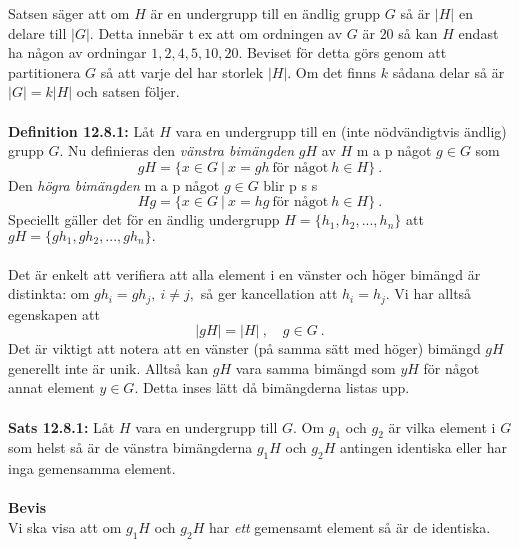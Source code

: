 \documentclass{article}
\begin{document}
Satsen säger att om $H$ är en undergrupp till en ändlig grupp $G$ så är $|H|$ en delare till $|G|$. Detta innebär t ex att om ordningen av $G$ är $20$ så kan $H$ endast ha någon av ordningar $1,2,4,5,10,20$. Beviset för detta görs genom att partitionera $G$ så att varje del har storlek $|H|$. Om det finns $k$ sådana delar så är $|G|=k|H|$ och satsen följer.\\ \\
\textbf{Definition 12.8.1:} Låt $H$ vara en undergrupp till en (inte nödvändigtvis ändlig) grupp $G$. Nu definieras den \textit{vänstra bimängden} $gH$ av $H$ m a p något $g\in G$ som
$$
gH=\{x\in G \ | \ x=gh \ \textrm{för något} \ h\in H\} \ .
$$
Den \textit{högra bimängden} m a p något $g\in G$ blir p s s
$$
Hg=\{x\in G \ | \ x=hg \ \textrm{för något} \ h\in H \} \ .
$$
Speciellt gäller det för en ändlig undergrupp $H=\{h_1,h_2,...,h_n\}$ att $gH=\{gh_1,gh_2,...,gh_n\}.$\\ \\
Det är enkelt att verifiera att alla element i en vänster och höger bimängd är distinkta: om $gh_i=gh_j, \ i\neq j,$ så ger kancellation att $h_i=h_j$. Vi har alltså egenskapen att
$$
|gH|=|H| \ , \quad g\in G \ .
$$
Det är viktigt att notera att en vänster (på samma sätt med höger) bimängd $gH$ generellt inte är unik. Alltså kan $gH$ vara samma bimängd som $yH$ för något annat element $y\in G$. Detta inses lätt då bimängderna listas upp.\\ \\ 
\textbf{Sats 12.8.1:} Låt $H$ vara en undergrupp till $G$. Om $g_1$ och $g_2$ är vilka element i $G$ som helst så är de vänstra bimängderna $g_1H$ och $g_2H$ antingen identiska eller har inga gemensamma element.\\ \\
\textbf{Bevis}\\
Vi ska visa att om $g_1H$ och $g_2H$ har \textit{ett} gemensamt element så är de identiska. 
\end{document}
